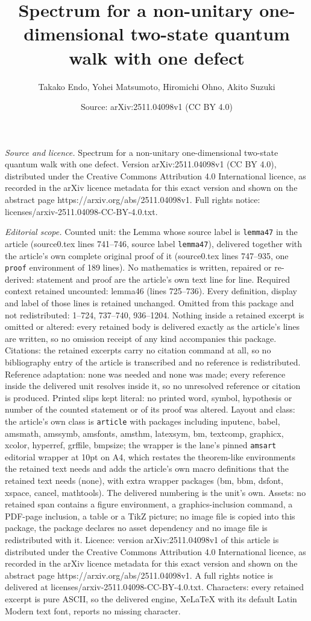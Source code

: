 \documentclass[10pt,a4paper]{amsart}
\title[Spectrum for a non-unitary one-dimensional two-state quantum]{Spectrum for a non-unitary one-dimensional two-state quantum walk with one defect}
\author{Takako Endo, Yohei Matsumoto, Hiromichi Ohno, Akito Suzuki}
\date{Source: arXiv:2511.04098v1 (CC BY 4.0)}
\begin{document}
\maketitle

\noindent\emph{Source and licence.} Spectrum for a non-unitary one-dimensional two-state quantum walk with one defect. Version arXiv:2511.04098v1 (CC BY 4.0), distributed under the Creative Commons Attribution 4.0 International licence, as recorded in the arXiv licence metadata for this exact version and shown on the abstract page https://arxiv.org/abs/2511.04098v1. Full rights notice: licenses/arxiv-2511.04098-CC-BY-4.0.txt.\par\smallskip

\noindent\textit{Editorial scope.} Counted unit: the Lemma whose source label is \texttt{lemma47} in the article (source0.tex lines 741--746, source label \texttt{lemma47}), delivered together with the article's own complete original proof of it (source0.tex lines 747--935, one \texttt{proof} environment of 189 lines). No mathematics is written, repaired or re-derived: statement and proof are the article's own text line for line. Required context retained uncounted: lemma46 (lines 725--736). Every definition, display and label of those lines is retained unchanged. Omitted from this package and not redistributed: 1--724, 737--740, 936--1204. Nothing inside a retained excerpt is omitted or altered: every retained body is delivered exactly as the article's lines are written, so no omission receipt of any kind accompanies this package. Citations: the retained excerpts carry no citation command at all, so no bibliography entry of the article is transcribed and no reference is redistributed. Reference adaptation: none was needed and none was made; every reference inside the delivered unit resolves inside it, so no unresolved reference or citation is produced. Printed slips kept literal: no printed word, symbol, hypothesis or number of the counted statement or of its proof was altered. Layout and class: the article's own class is \texttt{article} with packages including inputenc, babel, amsmath, amssymb, amsfonts, amsthm, latexsym, bm, textcomp, graphicx, xcolor, hyperref, grffile, bmpsize; the wrapper is the lane's pinned \texttt{amsart} editorial wrapper at 10pt on A4, which restates the theorem-like environments the retained text needs and adds the article's own macro definitions that the retained text needs (none), with extra wrapper packages (bm, bbm, dsfont, xspace, cancel, mathtools). The delivered numbering is the unit's own. Assets: no retained span contains a figure environment, a graphics-inclusion command, a PDF-page inclusion, a table or a TikZ picture; no image file is copied into this package, the package declares no asset dependency and no image file is redistributed with it. Licence: version arXiv:2511.04098v1 of this article is distributed under the Creative Commons Attribution 4.0 International licence, as recorded in the arXiv licence metadata for this exact version and shown on the abstract page https://arxiv.org/abs/2511.04098v1. A full rights notice is delivered at licenses/arxiv-2511.04098-CC-BY-4.0.txt. Characters: every retained excerpt is pure ASCII, so the delivered engine, XeLaTeX with its default Latin Modern text font, reports no missing character.
\end{document}
